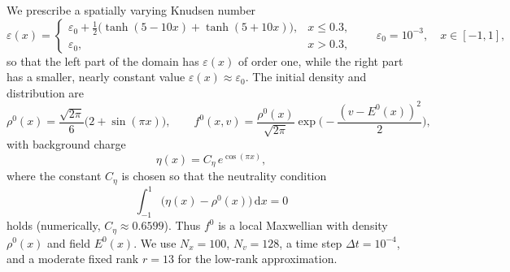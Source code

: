 \documentclass[]{article}
\numberwithin{equation}{section}
\newcommand{\dx}{\mathrm{d}x}
\begin{document}
We prescribe a spatially varying Knudsen number
\[
\varepsilon(x)=
\begin{cases}
\varepsilon_0+\tfrac12\big(\tanh(5-10x)+\tanh(5+10x)\big), & x\le 0.3,\\[2pt]
\varepsilon_0, & x>0.3,
\end{cases}
\qquad \varepsilon_0=10^{-3},\quad x\in[-1,1],
\]
so that the left part of the domain has $\varepsilon(x)$ of order one, while the right part has a smaller, nearly constant value $\varepsilon(x)\approx \varepsilon_0$. 
The initial density and distribution are
\[
\rho^0(x)=\frac{\sqrt{2\pi}}{6}\big(2+\sin(\pi x)\big),\qquad
f^0(x,v)=\frac{\rho^0(x)}{\sqrt{2\pi}}\exp\!\Big(-\frac{(v-E^0(x))^2}{2}\Big),
\]
with background charge
\[
  \eta(x) = C_\eta\,e^{\cos(\pi x)},
\]
where the constant $C_\eta$ is chosen so that the neutrality condition
\[
  \int_{-1}^1\big(\eta(x)-\rho^0(x)\big)\,\dx = 0
\]
holds (numerically, $C_\eta \approx 0.6599$).
Thus $f^0$ is a local Maxwellian with density $\rho^0(x)$ and field $E^0(x)$. 
We use $N_x=100$,  $N_v=128$, a time step $\Delta t=10^{-4}$, and a moderate fixed rank $r = 13$ for the low-rank approximation.
\end{document}
